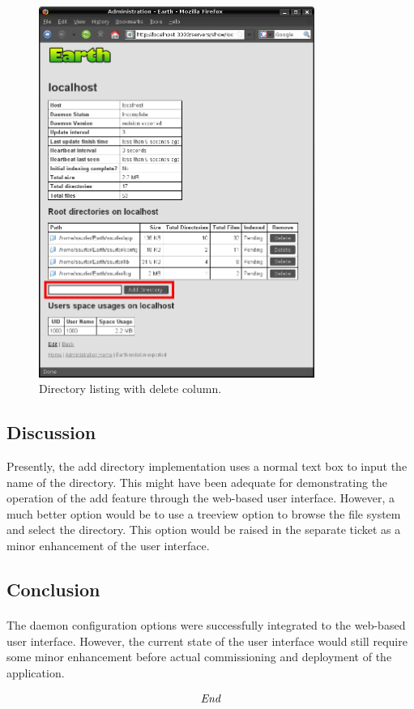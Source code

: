 \documentclass[oneside, 10pt, a4]{article}
\begin{document}
\begin{figure}[h!]
\begin{center}
\includegraphics[width=90mm]{figs/addoption}
\end{center}
\caption{Directory listing with delete column.}
\label{fig:addoption}
\end{figure}


\paragraph{}

\subsection*{Discussion}
Presently, the add directory implementation uses a normal text box to input the name of the directory. This
might have been adequate for demonstrating the operation of the add feature through the web-based user interface.
However, a much better option would be to use a treeview option to browse the file system and select the directory.
This option would be raised in the separate ticket as a minor enhancement of the user interface.


\subsection*{Conclusion}

\paragraph{}
The daemon configuration options were successfully integrated to the web-based user interface. However, the current state
of the user interface would still require some minor enhancement before actual commissioning and deployment of the application.

\[\emph{End}\]
\end{document}
